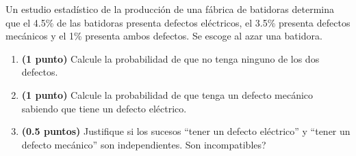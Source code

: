 
Un estudio estadístico de la producción de una fábrica de batidoras determina que el 4.5\% de las batidoras presenta defectos eléctricos, el 3.5\% presenta defectos mecánicos y el 1\% presenta ambos defectos. Se escoge al azar una batidora.
\begin{enumerate}[label=\alph*)]
\item \textbf{(1 punto)} Calcule la probabilidad de que no tenga ninguno de los dos defectos.
\item \textbf{(1 punto)} Calcule la probabilidad de que tenga un defecto mecánico sabiendo que tiene un defecto eléctrico.
\item \textbf{(0.5 puntos)} Justifique si los sucesos ``tener un defecto eléctrico'' y ``tener un defecto mecánico'' son independientes. \textquestiondown{}Son incompatibles?
\end{enumerate}
